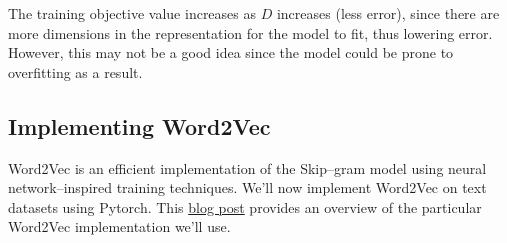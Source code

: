 \begin{solution}
    The training objective value increases as $D$ increases (less error), since there are more dimensions in the representation for the model to fit, thus lowering error. However, this may not be a good idea since the model could be prone to overfitting as a result.
\end{solution}

\subsection{Implementing Word2Vec}
Word2Vec is an efficient implementation of the Skip--gram model using neural network--inspired training techniques. We'll now implement Word2Vec on text datasets using Pytorch.  This  
\href{http://mccormickml.com/2016/04/19/word2vec-tutorial-the-skip-gram-model/}{blog post} provides an overview of the particular Word2Vec implementation we'll use.

